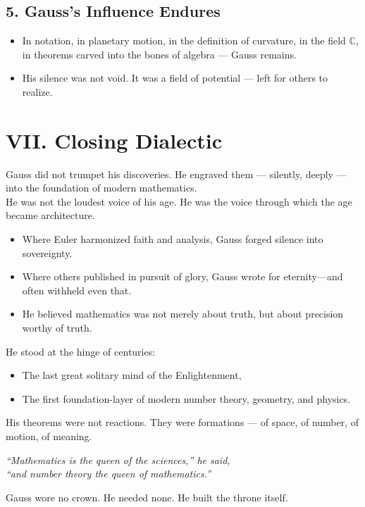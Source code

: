 \documentclass[9pt]{article}
\begin{document}
\vspace{1em}

\subsection*{5. Gauss’s Influence Endures}

\begin{itemize}
  \item In notation, in planetary motion, in the definition of curvature, in the field $\mathbb{C}$, in theorems carved into the bones of algebra — Gauss remains.
  \item His silence was not void. It was a field of potential — left for others to realize.
\end{itemize}

\newpage

\section*{VII. Closing Dialectic}

\noindent
Gauss did not trumpet his discoveries.  
He engraved them — silently, deeply — into the foundation of modern mathematics.\\

\noindent
He was not the loudest voice of his age.  
He was the voice through which the age became architecture.\\

\begin{itemize}
  \item Where Euler harmonized faith and analysis, Gauss forged silence into sovereignty.
  \item Where others published in pursuit of glory, Gauss wrote for eternity—and often withheld even that.
  \item He believed mathematics was not merely about truth, but about precision worthy of truth.
\end{itemize}

\noindent
He stood at the hinge of centuries:
\begin{itemize}
  \item The last great solitary mind of the Enlightenment,
  \item The first foundation-layer of modern number theory, geometry, and physics.
\end{itemize}

\noindent
His theorems were not reactions.  
They were formations — of space, of number, of motion, of meaning.

\begin{center}
\textit{“Mathematics is the queen of the sciences,” he said,}\\
\textit{“and number theory the queen of mathematics.”}
\end{center}

\noindent
Gauss wore no crown. He needed none.  
He built the throne itself.
\end{document}
